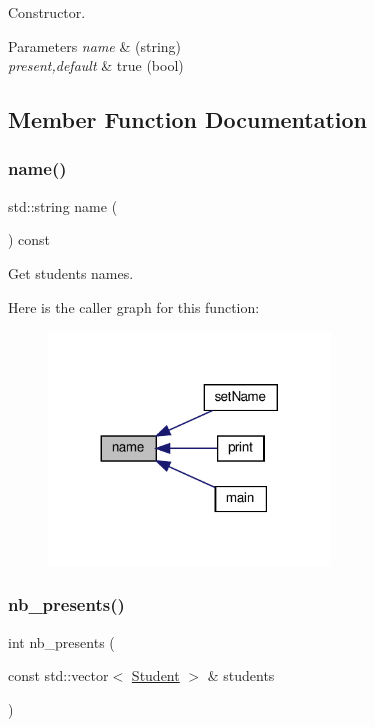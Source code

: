 Constructor. 


\begin{DoxyParams}{Parameters}
{\em name} & (string) \\
\hline
{\em present,default} & true (bool) \\
\hline
\end{DoxyParams}


\subsection{Member Function Documentation}
\mbox{\label{classStudent_a1d89c28bd42ba9a52da008bb69367171}} 
\subsubsection{\texorpdfstring{name()}{name()}}
{\footnotesize\ttfamily std\+::string name (\begin{DoxyParamCaption}{ }\end{DoxyParamCaption}) const}



Get students\textquotesingle{} names. 

Here is the caller graph for this function\+:
\nopagebreak
\begin{figure}[H]
\begin{center}
\leavevmode
\includegraphics[width=212pt]{classStudent_a1d89c28bd42ba9a52da008bb69367171_icgraph}
\end{center}
\end{figure}
\mbox{\label{classStudent_ac8e5bc83d3632e30a849bf0163350d7b}} 
\subsubsection{\texorpdfstring{nb\+\_\+presents()}{nb\_presents()}}
{\footnotesize\ttfamily int nb\+\_\+presents (\begin{DoxyParamCaption}\item[{const std\+::vector$<$ \hyperlink{classStudent}{Student} $>$ \&}]{students }\end{DoxyParamCaption})\hspace{0.3cm}{\ttfamily [static]}}



